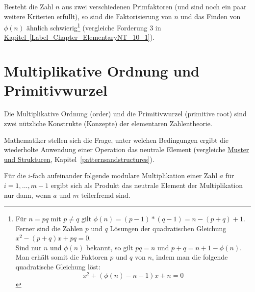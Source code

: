 \begin{refsegment}
Besteht die Zahl $n$ aus zwei verschiedenen Primfaktoren (und sind noch ein
paar weitere Kriterien erfüllt), so sind die Faktorisierung von $n$ und das Finden von $\phi(n)$ ähnlich schwierig\footnote{%
Für $n=pq$  mit $p\neq q$ gilt $ \phi(n) = (p-1)*(q-1)
= n -(p+q)+1.$ Ferner sind die Zahlen $p$ und $q$ Lösungen der quadratischen Gleichung
$x^2-(p+q)x+pq=0. $\\
Sind nur
$n$ und $\phi(n)$ bekannt, so gilt $pq=n$ und $p+q= n +1 -\phi(n).$  Man erhält somit die Faktoren $p$ und $q$ von $n$, indem man die folgende quadratische Gleichung löst:
$$ x^2 +(\phi(n)-n-1)x +n=0 $$
}
(vergleiche Forderung 3 in \hyperlink{Chapter_ElementaryNT_10_1}
{Kapitel~\ref{Label_Chapter_ElementaryNT_10_1}}).



\hypertarget{Chapter_ElementaryNT_9}{}
\section[Multiplikative Ordnung und Primitivwurzel]
        {Multiplikative Ordnung und Primitivwurzel\footnotemark}
\label{MultOrdPrimitveRoot}

Die Multiplikative Ordnung (order) und die Primitivwurzel (primitive root)
sind zwei nützliche Konstrukte (Konzepte) der elementaren Zahlentheorie.

Mathematiker stellen sich die Frage, unter welchen Bedingungen ergibt
die wiederholte Anwendung einer Operation das neutrale Element
(vergleiche \hyperlink{patternsandstructures}{Muster und Strukturen},
Kapitel~\ref{patternsandstructures}).

Für die $i$-fach aufeinander folgende modulare Multiplikation einer
Zahl $a$ für \mbox{$i=1, \dots, m-1$} ergibt sich als Produkt das neutrale
Element der Multiplikation nur dann, wenn $a$ und $m$
teilerfremd sind.


\end{refsegment}
